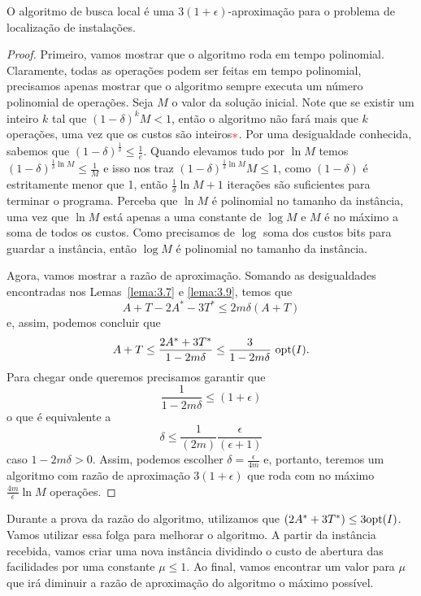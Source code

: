 \begin{theorem}
    O algoritmo de busca local é uma $3(1+\epsilon)$-aproximação para o problema de localização de instalações.
\end{theorem}
\begin{proof}
    Primeiro, vamos mostrar que o algoritmo roda em tempo polinomial. Claramente, todas as operações podem ser feitas em tempo polinomial, precisamos apenas mostrar que o algoritmo sempre executa um número polinomial de operações.
    Seja $M$ o valor da solução inicial. Note que se existir um inteiro $k$ tal que $(1-\delta)^kM < 1$, então o algoritmo não fará mais que $k$ operações, uma vez que os custos são inteiros${\color{red}{*}}$. Por uma desigualdade conhecida, sabemos que $(1 - \delta)^{\frac{1}{\delta}} \leq \frac{1}{e}$. Quando elevamos tudo por $\ln M$ temos $(1- \delta)^{\frac{1}{\delta}\ln M} \leq \frac{1}{M}$ e isso nos traz $ (1- \delta)^{\frac{1}{\delta}\ln M}M \leq 1$, como $(1-\delta)$ é estritamente menor que 1, então $\frac{1}{\delta}\ln M + 1$ iterações são suficientes para terminar o programa. Perceba que $\ln M$ é polinomial no tamanho da instância, uma vez que $\ln M$ está apenas a uma constante de $\log M$ e $M$ é no máximo a soma de todos os custos. Como precisamos de $\log$ soma dos custos bits para guardar a instância, então $\log M$ é polinomial no tamanho da instância.

    Agora, vamos mostrar a razão de aproximação. Somando as desigualdades encontradas nos Lemas~\ref{lema:3.7} e \ref{lema:3.9}, temos que 
        \[A + T - 2A^* - 3T^* \leq 2m\delta(A+T)\] 
        e, assim, podemos concluir que
        \[A+T \leq \frac{2A^* + 3T^*}{1-2m\delta} \leq \frac{3}{1-2m\delta} \ \opt(I).\]
    Para chegar onde queremos precisamos garantir que \[\frac{1}{1-2m\delta}\leq (1+\epsilon)\]
    o que é equivalente a 
    \[\delta \leq \frac{1}{(2m)} \frac{\epsilon}{(\epsilon+1)}\]
    caso $ 1 - 2m\delta >0$.
    Assim, podemos escolher $\delta = \frac{\epsilon}{4m}$ e, portanto, teremos um algoritmo com razão de aproximação $3(1+\epsilon)$ que roda com no máximo $\frac{4m}{\epsilon}\ln M$ operações.
\end{proof}
Durante a prova da razão do algoritmo, utilizamos que $(2A^* + 3T^*) \leq 3\mathrm{opt}(I)$. Vamos utilizar essa folga para melhorar o algoritmo. 
A partir da instância recebida, vamos criar uma nova instância dividindo o custo de abertura das facilidades por uma constante $\mu \leq 1$. Ao final, vamos encontrar um valor para $\mu$ que irá diminuir a razão de aproximação do algoritmo o máximo possível. 

